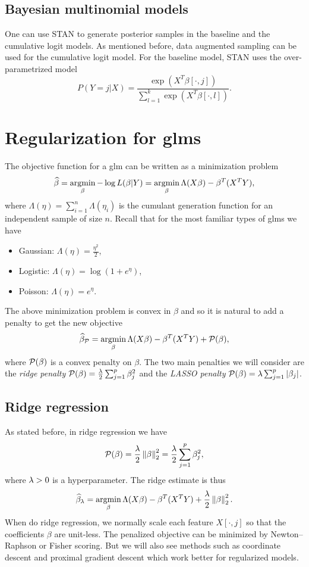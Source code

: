\subsection{Bayesian multinomial models}
One can use STAN to generate posterior samples in the baseline and the cumulative logit models. As mentioned before, data augmented sampling can be used for the cumulative logit model. For the baseline model, STAN uses the over-parametrized model
\[P(Y=j|X) = \frac{\exp(X^T\beta[\cdot,j])}{\sum_{l=1}^k \exp(X^T\beta[\cdot,l])}. \]
\section{Regularization for glms}
The objective function for a glm can be written as a minimization problem
\[\widehat{\beta}=\operatorname*{argmin}_\beta -\log L(\beta|Y) = \operatorname*{argmin}_\beta \Lambda(X\beta)-\beta^T(X^TY), \]
where $\Lambda(\eta)=\sum_{i=1}^n \Lambda(\eta_i)$ is the cumulant generation function for an independent sample of size $n$. Recall that for the most familiar types of glms we have
\begin{itemize}
    \item Gaussian: $\Lambda(\eta)= \frac{\eta^2}{2}$,
    \item Logistic: $\Lambda(\eta)= \log(1+e^{\eta})$,
    \item Poisson: $\Lambda(\eta) = e^\eta$.
\end{itemize}

The above minimization problem is convex in $\beta$ and so it is natural to add a penalty to get the new objective
\[\widehat{\beta}_{\mathcal{P}} = \operatorname*{argmin}_\beta \Lambda(X\beta)-\beta^T(X^TY)+{\mathcal{P}}(\beta), \]
where ${\mathcal{P}}(\beta)$ is a convex penalty on $\beta$. The two main penalties we will consider are the \emph{ridge penalty} ${\mathcal{P}}(\beta) = \frac{\lambda}{2}\sum_{j=1}^p \beta_j^2$ and the \emph{LASSO penalty} ${\mathcal{P}}(\beta) = \lambda \sum_{j=1}^p {\left\lvert\beta_j\right\rvert}$.
\subsection{Ridge regression}
As stated before, in ridge regression we have
\[{\mathcal{P}}(\beta) = \frac{\lambda}{2}\left\|\beta\right\|_2^2 = \frac{\lambda}{2}\sum_{j=1}^p \beta_j^2, \]
where $\lambda > 0$ is a hyperparameter. The ridge estimate is thus
\[\widehat{\beta}_\lambda = \operatorname*{argmin}_\beta \Lambda(X\beta)-\beta^T(X^TY)+\frac{\lambda}{2}\left\|\beta\right\|_2^2. \]
When do ridge regression, we normally scale each feature $X[\cdot,j]$ so that the coefficients $\beta$ are unit-less. The penalized objective can be minimized by Newton--Raphson or Fisher scoring. But we will also see methods such as coordinate descent and proximal gradient descent which work better for regularized models. 
